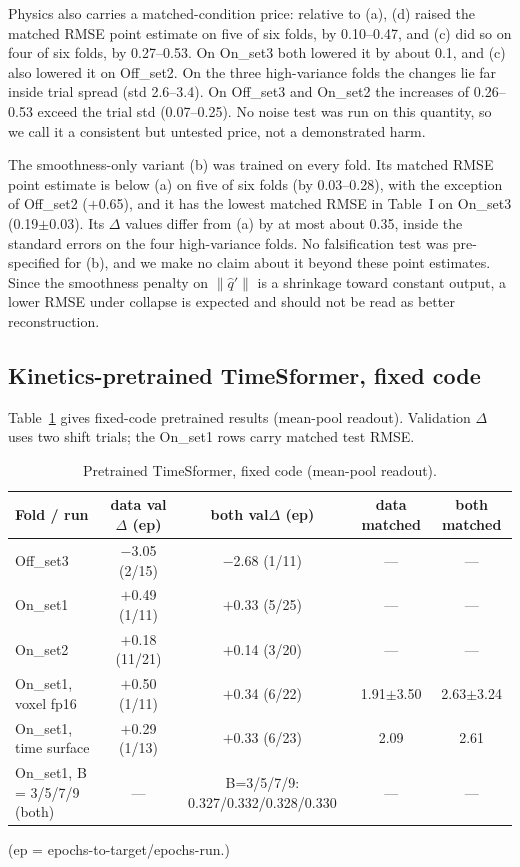 \documentclass[conference]{IEEEtran}
\begin{document}
Physics also carries a matched-condition price: relative to (a), (d) raised the matched RMSE point estimate on five of six folds, by 0.10--0.47, and (c) did so on four of six folds, by 0.27--0.53. On On\_set3 both lowered it by about 0.1, and (c) also lowered it on Off\_set2. On the three high-variance folds the changes lie far inside trial spread (std 2.6--3.4). On Off\_set3 and On\_set2 the increases of 0.26--0.53 exceed the trial std (0.07--0.25). No noise test was run on this quantity, so we call it a consistent but untested price, not a demonstrated harm.

The smoothness-only variant (b) was trained on every fold. Its matched RMSE point estimate is below (a) on five of six folds (by 0.03--0.28), with the exception of Off\_set2 ($+$0.65), and it has the lowest matched RMSE in Table~I on On\_set3 (0.19$\pm$0.03). Its $\Delta$ values differ from (a) by at most about 0.35, inside the standard errors on the four high-variance folds. No falsification test was pre-specified for (b), and we make no claim about it beyond these point estimates. Since the smoothness penalty on $\|\hat{q}'\|$ is a shrinkage toward constant output, a lower RMSE under collapse is expected and should not be read as better reconstruction.

\subsection{Kinetics-pretrained TimeSformer, fixed code}
Table~\ref{tab:pretrained} gives fixed-code pretrained results (mean-pool readout). Validation $\Delta$ uses two shift trials; the On\_set1 rows carry matched test RMSE.
\begin{table}[t]
\caption{Pretrained TimeSformer, fixed code (mean-pool readout).}
\label{tab:pretrained}
\centering
\begin{tabular}{lcccc}
\hline
Fold / run & data val$\Delta$ (ep) & both val$\Delta$ (ep) & data matched & both matched \\
\hline
Off\_set3 & $-$3.05 (2/15) & $-$2.68 (1/11) & --- & --- \\
On\_set1 & $+$0.49 (1/11) & $+$0.33 (5/25) & --- & --- \\
On\_set2 & $+$0.18 (11/21) & $+$0.14 (3/20) & --- & --- \\
On\_set1, voxel fp16 & $+$0.50 (1/11) & $+$0.34 (6/22) & 1.91$\pm$3.50 & 2.63$\pm$3.24 \\
On\_set1, time surface & $+$0.29 (1/13) & $+$0.33 (6/23) & 2.09 & 2.61 \\
On\_set1, B = 3/5/7/9 (both) & --- & B=3/5/7/9: 0.327/0.332/0.328/0.330 & --- & --- \\
\hline
\end{tabular}
\end{table}
\noindent (ep = epochs-to-target/epochs-run.)
\end{document}
